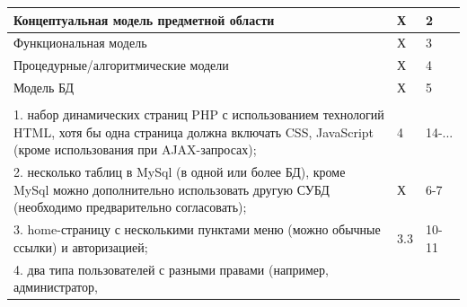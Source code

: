 \documentclass[a4paper,12pt]{article}
\begin{document}
\begin{longtable}{|p{7cm}|p{3cm}|p{3cm}|}
    Концептуальная модель предметной области                                                              & Х                                    & 2                                                                                       \\
    \hline
    Функциональная модель                                                                                 & Х                                    & 3                                                                                       \\
    \hline
    Процедурные/алгоритмические модели                                                                    & Х                                    & 4                                                                                       \\
    \hline
    Модель БД                                                                                             & Х                                    & 5                                                                                       \\                                                                                                                                                                                                                                                &                                      &                                                                                         \\
    \hline
    1. набор динамических страниц PHP с использованием технологий HTML,
    хотя бы одна страница должна включать CSS, JavaScript (кроме использования при AJAX-запросах);        & 4                                    & 14-...                                                                                  \\
    \hline
    2. несколько таблиц в MySql (в одной или более БД),
    кроме MySql можно дополнительно использовать другую СУБД (необходимо предварительно согласовать);     & Х                                    & 6-7                                                                                     \\
    \hline
    3. home-страницу с несколькими пунктами меню (можно обычные ссылки) и авторизацией;                   & 3.3                                  & 10-11                                                                                   \\
    \hline
    4. два типа пользователей с разными правами (например, администратор,

\end{longtable}
\end{document}

